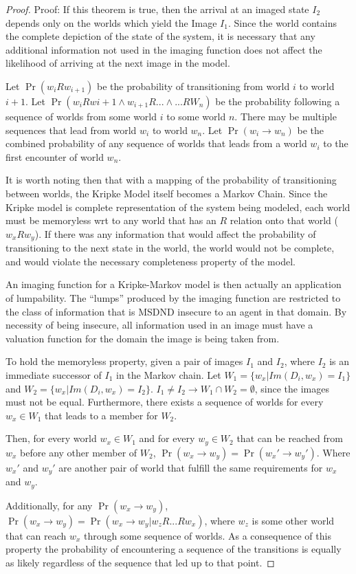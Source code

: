 \begin{proof}
Proof: If this theorem is true, then the arrival at an imaged state $I_2$ depends only on the worlds which yield the Image $I_1$. Since the world contains the complete depiction of the state of the system, it is necessary that any additional information not used in the imaging function does not affect the likelihood of arriving at the next image in the model.

Let $\Pr(w_{i}Rw_{i+1})$ be the probability of transitioning from world $i$ to world $i+1$. Let $\Pr(w_{i}Rw{i+1} \wedge w_{i+1}R... \wedge ...RW_{n})$ be the probability following a sequence of worlds from some world $i$ to some world $n$. There may be multiple sequences that lead from world $w_i$ to world $w_n$. Let $\Pr(w_i \rightarrow w_n)$ be the combined probability of any sequence of worlds that leads from a world $w_i$ to the first encounter of world $w_n$.

It is worth noting then that with a mapping of the probability of transitioning between worlds, the Kripke Model itself becomes a Markov Chain.
Since the Kripke model is complete representation of the system being modeled, each world must be memoryless wrt to any world that has an $R$ relation onto that world ($w_xRw_y$).
If there was any information that would affect the probability of transitioning to the next state in the world, the world would not be complete, and would violate the necessary completeness property of the model.

An imaging function for a Kripke-Markov model is then actually an application of lumpability\cite{markov-lumpability}.
The ``lumps'' produced by the imaging function are restricted to the class of information that is MSDND insecure to an agent in that domain.
By necessity of being insecure, all information used in an image must have a valuation function for the domain the image is being taken from.

To hold the memoryless property, given a pair of images $I_1$ and $I_2$, where $I_2$ is an immediate successor of $I_1$ in the Markov chain. Let $W_1 = \{ w_x | Im(D_i, w_x) = I_1 \}$ and $W_2 = \{ w_x | Im(D_i, w_x) = I_2 \}$. $I_1 \neq I_2 \rightarrow W_1 \cap W_2 = \emptyset$, since the images must not be equal. Furthermore, there exists a sequence of worlds for every $w_x \in W_1$ that leads to a member for $W_2$.

Then, for every world $w_x \in W_1$ and for every $w_y \in W_2$ that can be reached from $w_x$ before any other member of $W_2$, $\Pr(w_x \rightarrow w_y) = \Pr(w_x' \rightarrow w_y')$. Where $w_x'$ and $w_y'$ are another pair of world that fulfill the same requirements for $w_x$ and $w_y$.

Additionally, for any $\Pr(w_x \rightarrow w_y)$, $\Pr(w_x \rightarrow w_y) = \Pr(w_x \rightarrow w_y | w_{z}R...Rw_{x})$, where $w_z$ is some other world that can reach $w_x$ through some sequence of worlds. As a consequence of this property the probability of encountering a sequence of the transitions is equally as likely regardless of the sequence that led up to that point.
\end{proof}

